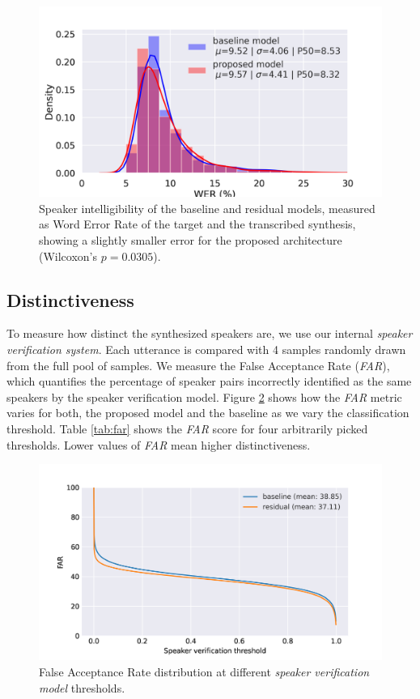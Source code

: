 \begin{figure}[h]
	\centering
	\includegraphics[width=0.7\linewidth]{tts/images/wer}
	\caption{Speaker intelligibility of the baseline and residual models, measured as Word Error Rate of the target and the transcribed synthesis, showing a slightly smaller error for the proposed architecture (Wilcoxon's $p=0.0305$).}
	\label{fig:wer}
\end{figure}


\subsection{Distinctiveness}
To measure how distinct the synthesized speakers are, we use our internal \textit{speaker verification system}.  Each utterance is compared with 4 samples randomly drawn from the full pool of samples. We measure the False Acceptance Rate (\textit{FAR}), which quantifies the percentage of speaker pairs incorrectly identified as the same speakers by the speaker verification model. Figure \ref{fig:far} shows how the \textit{FAR} metric varies for both, the proposed model and the baseline as we vary the classification threshold. Table \ref{tab:far} shows the \textit{FAR} score for four arbitrarily picked thresholds. Lower values of \textit{FAR} mean higher distinctiveness.

\begin{figure}[h]
	\centering
	\includegraphics[width=.7\linewidth]{tts/images/far}
	\caption{False Acceptance Rate distribution at different \textit{speaker verification model} thresholds.}
	\label{fig:far}
\end{figure}


